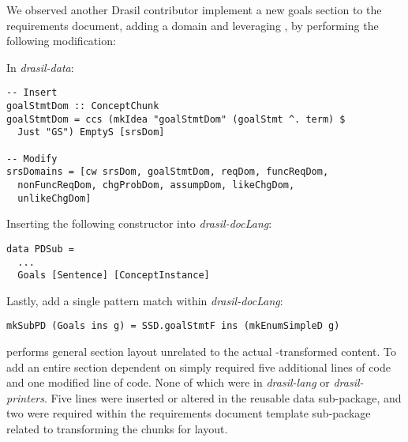 We observed another Drasil contributor implement a new goals section to the requirements document, adding a domain and leveraging , by performing the following modification:

In \textit{drasil-data}:
\begin{tcolorbox}
\begin{verbatim}
-- Insert
goalStmtDom :: ConceptChunk
goalStmtDom = ccs (mkIdea "goalStmtDom" (goalStmt ^. term) $
  Just "GS") EmptyS [srsDom]

-- Modify
srsDomains = [cw srsDom, goalStmtDom, reqDom, funcReqDom,
  nonFuncReqDom, chgProbDom, assumpDom, likeChgDom,
  unlikeChgDom]
\end{verbatim}
\end{tcolorbox}

Inserting the following constructor into \textit{drasil-docLang}:
\begin{tcolorbox}
\begin{verbatim}
data PDSub =
  ...
  Goals [Sentence] [ConceptInstance]
\end{verbatim}
\end{tcolorbox}

Lastly, add a single pattern match within \textit{drasil-docLang}:
\begin{tcolorbox}
\begin{verbatim}
mkSubPD (Goals ins g) = SSD.goalStmtF ins (mkEnumSimpleD g)
\end{verbatim}
\end{tcolorbox}

 performs general section layout unrelated to the actual -transformed content. To add an entire section dependent on  simply required five additional lines of code and one modified line of code. None of which were in \textit{drasil-lang} or \textit{drasil-printers}. Five lines were inserted or altered in the reusable data sub-package, and two were required within the requirements document template sub-package related to transforming the chunks for layout.


